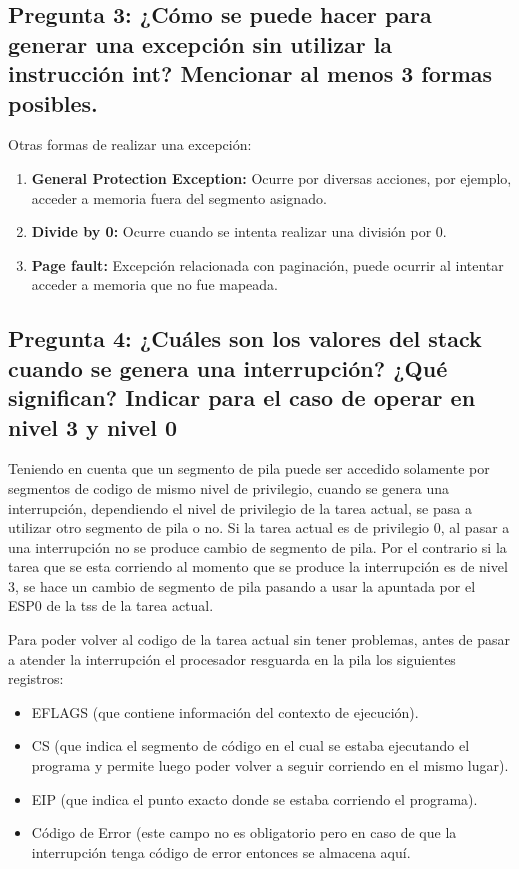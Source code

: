 \documentclass[a4paper,10pt,twoside]{article}
\begin{document}
\subsection{Pregunta 3: ¿Cómo se puede hacer para generar una excepción sin utilizar la instrucción int? Mencionar al menos 3 formas posibles.}

Otras formas de realizar una excepción:
\begin{enumerate}
	\item \textbf{General Protection Exception:}
	Ocurre por diversas acciones, por ejemplo, acceder a memoria fuera del segmento asignado.
	\item \textbf{Divide by 0:}
	Ocurre cuando se intenta realizar una división por 0.
	\item \textbf{Page fault:}
	Excepción relacionada con paginación, puede ocurrir al intentar acceder a memoria que no fue mapeada.
\end{enumerate}


\subsection{Pregunta 4: ¿Cuáles son los valores del stack cuando se genera una interrupción? ¿Qué significan? Indicar para el caso de operar en nivel 3 y nivel 0}

Teniendo en cuenta que un segmento de pila puede ser accedido solamente por segmentos de codigo de mismo nivel de privilegio, cuando se genera una interrupción, dependiendo el nivel de privilegio de la tarea actual, se pasa a utilizar otro segmento de pila o no. Si la tarea actual es de privilegio 0, al pasar a una interrupción no se produce cambio de segmento de pila. Por el contrario si la tarea que se esta corriendo al momento que se produce la interrupción es de nivel 3, se hace un cambio de segmento de pila pasando a usar la apuntada por el ESP0 de la tss de la tarea actual.

Para poder volver al codigo de la tarea actual sin tener problemas, antes de pasar a atender la interrupción el procesador resguarda en la pila los siguientes registros:

\begin{itemize}
 \item EFLAGS (que contiene información del contexto de ejecución).
 \item CS (que indica el segmento de código en el cual se estaba ejecutando el programa y permite luego poder volver a seguir corriendo en el mismo lugar).
 \item EIP (que indica el punto exacto donde se estaba corriendo el programa).
 \item Código de Error (este campo no es obligatorio pero en caso de que la interrupción tenga código de error entonces se almacena aquí.
\end{itemize}
\end{document}
